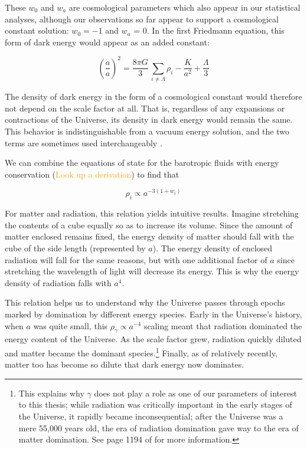 These $w_0$ and $w_a$ are cosmological parameters which also appear in our
statistical analyses, although our observations so far appear to support
a cosmological constant solution: $w_0 = -1$ and $w_a$ = 0. In the first
Friedmann equation, this form of dark energy would appear as an added
constant:

\begin{equation}
\label{eq: cosmo_constant}
\left( \frac{\dot{a}}{a} \right)^2
=
\frac{8 \pi G}{3} \, \sum_{i \neq \Lambda} \rho_i
-
\frac{K}{a^2}
+
\frac{\Lambda}{3}
\end{equation}

The density of dark energy in the form of a cosmological constant would
therefore not depend on the scale
factor at all. That is, regardless of any expansions or contractions of the
Universe, its density in dark energy would remain the same. This behavior is
indistinguishable from a vacuum energy solution, and the two terms are
sometimes used interchangeably . 

We can combine the equations of state for the barotropic fluids with energy 
conservation (\textcolor{orange}{Look up a derivation}) to find that

\begin{equation}
\label{eq: scale_factor_to_density}
\rho_i \propto a^{-3 (1 + w_i)}
\end{equation}

For matter and radiation, this relation yields intuitive results. Imagine
stretching the contents of a cube equally so as to increase its volume. Since
the amount of matter enclosed remains fixed, the energy density of matter
should fall
with the cube of the side length (represented by $a$). The energy density of
enclosed radiation will fall for the same reasons, but with one additional
factor of $a$ since stretching the wavelength of light will decrease its
energy. This is why the energy density of radiation falls with
$a^4$.

This relation helps us to understand why the Universe passes through epochs
marked by domination by different energy species. Early in the Universe's
history, when $a$ was quite small, this $\rho_\gamma \propto a^{-4}$ scaling
meant that radiation dominated the energy content of the Universe.
As the scale factor grew, radiation quickly diluted and matter became the 
dominant species.\footnote{This explains why $\gamma$ does not play a role as 
one of our
parameters of interest to this thesis; while radiation was critically 
important in the early stages of the Universe, it rapidly became 
inconsequential; after the Universe was a mere 55,000 years old, the
era of radiation domination gave way to the era of matter domination. See page 
1194 of \citet{CO} for more information.}
Finally, as of relatively recently, matter too
has become so dilute that dark energy now dominates. 

